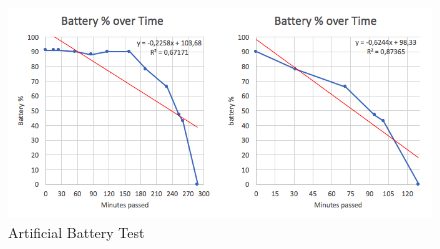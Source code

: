\begin{figure}[h!]
    \centering
    \includegraphics[width=1\textwidth]{figures/batteryTest.png}
    \caption{Artificial Battery Test}
    \label{battery_test}
\end{figure}